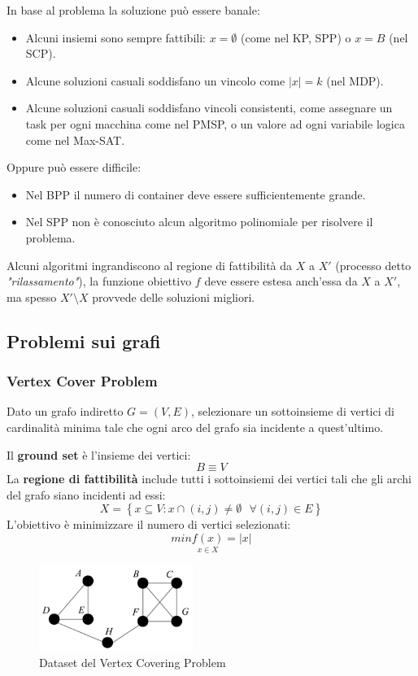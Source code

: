 \documentclass{article}
\begin{document}
In base al problema la soluzione può essere banale:
\begin{itemize}
    \item Alcuni insiemi sono sempre fattibili: $x=\emptyset$ (come nel KP, SPP) o $x=B$ (nel SCP).
    \item Alcune soluzioni casuali soddisfano un vincolo come $|x|=k$ (nel MDP).
    \item Alcune soluzioni casuali soddisfano vincoli consistenti, come assegnare un task per ogni macchina
          come nel PMSP, o un valore ad ogni variabile logica come nel Max-SAT.
\end{itemize}
Oppure può essere difficile:
\begin{itemize}
    \item Nel BPP il numero di container deve essere sufficientemente grande.
    \item Nel SPP non è conosciuto alcun algoritmo polinomiale per risolvere il problema.
\end{itemize}

Alcuni algoritmi ingrandiscono al regione di fattibilità da $X$ a $X'$ (processo detto \textit{"rilassamento"}),
la funzione obiettivo $f$ deve essere estesa anch'essa da $X$ a $X'$, ma spesso $X'\setminus X$ provvede delle
soluzioni migliori.

\subsection{Problemi sui grafi}
\subsubsection{Vertex Cover Problem}
Dato un grafo indiretto $G=(V,E)$, selezionare un sottoinsieme di vertici di cardinalità minima tale che ogni
arco del grafo sia incidente a quest'ultimo.

Il \textbf{ground set} è l'insieme dei vertici:
$$B\equiv V$$
La \textbf{regione di fattibilità} include tutti i sottoinsiemi dei vertici tali che gli archi del grafo siano
incidenti ad essi:
$$X=\left\{x\subseteq V:x\cap (i,j)\neq\emptyset \text{ }\forall (i,j)\in E\right\}$$
L'obiettivo è minimizzare il numero di vertici selezionati:
$$min\underset{x\in X}{f(x)}=|x|$$

\begin{figure}[H]
    \centering
    \includegraphics[width=5cm]{images/VCP_dataset.png}
    \caption{Dataset del Vertex Covering Problem}
    \label{fig:dataset_VCP}
\end{figure}
\end{document}
